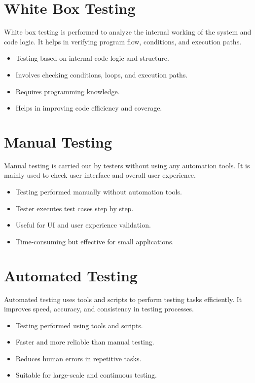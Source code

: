 \documentclass{SSBT-BE}
\begin{document}
\section{White Box Testing}
White box testing is performed to analyze the internal working of the system and code logic.
It helps in verifying program flow, conditions, and execution paths.
\begin{itemize}
    \item Testing based on internal code logic and structure.
    \item Involves checking conditions, loops, and execution paths.
    \item Requires programming knowledge.
    \item Helps in improving code efficiency and coverage.
\end{itemize}

\section{Manual Testing}
Manual testing is carried out by testers without using any automation tools.
It is mainly used to check user interface and overall user experience.
\begin{itemize}
    \item Testing performed manually without automation tools.
    \item Tester executes test cases step by step.
    \item Useful for UI and user experience validation.
    \item Time-consuming but effective for small applications.
\end{itemize}

\section{Automated Testing}
Automated testing uses tools and scripts to perform testing tasks efficiently.
It improves speed, accuracy, and consistency in testing processes.
\begin{itemize}
    \item Testing performed using tools and scripts.
    \item Faster and more reliable than manual testing.
    \item Reduces human errors in repetitive tasks.
    \item Suitable for large-scale and continuous testing.
\end{itemize}
\end{document}
